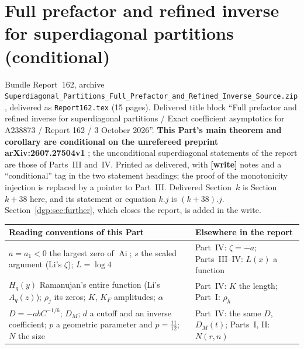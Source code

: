 \documentclass[11pt,letterpaper]{article}
\numberwithin{equation}{section}
\theoremstyle{remark}\newtheorem{remark}[theorem]{Remark}
\newcommand{\file}[1]{\nolinkurl{#1}}
\newcommand{\partsource}[1]{\par\noindent\begin{minipage}{\textwidth}\small #1\end{minipage}\par\medskip}
\begin{document}
\part{Full prefactor and refined inverse for superdiagonal partitions (conditional)}\label{dgp:pre:part}
\partsource{Bundle Report~162, archive \file{Superdiagonal_Partitions_Full_Prefactor_and_Refined_Inverse_Source.zip}, delivered as \file{Report162.tex} (15 pages). Delivered title block ``Full prefactor and refined inverse for superdiagonal partitions / Exact coefficient asymptotics for A238873 / Report 162 / 3 October 2026''. \textbf{This Part's main theorem and corollary are conditional on the unrefereed preprint arXiv:2607.27504v1} \cite{li}; the unconditional superdiagonal statements of the report are those of Parts~III and~IV. Printed as delivered, with \textbf{[write]} notes and a ``conditional'' tag in the two statement headings; the proof of the monotonicity injection is replaced by a pointer to Part~III. Delivered Section~$k$ is Section~$k+38$ here, and its statement or equation $k.j$ is $(k+38).j$. Section~\ref{dgp:sec:further}, which closes the report, is added in the write.}
\begin{center}
\small
\begin{tabular}{@{}>{\raggedright\arraybackslash}p{} >{\raggedright\arraybackslash}p{}@{}}
\toprule
Reading conventions of this Part & Elsewhere in the report\\
\midrule
$a=a_1<0$ the largest zero of $\operatorname{Ai}$; $s$ the scaled argument (Li's $\zeta$); $L=\log4$ & Part~IV: $\zeta=-a$; Parts~III--IV: $L(x)$ a function\\
$H_q(y)$ Ramanujan's entire function (Li's $A_q(z)$); $\rho_j$ its zeros; $K$, $K_F$ amplitudes; $\alpha$ & Part~IV: $K$ the length; Part~I: $\rho_h$\\
$D=-abC^{-1/6}$; $D_M$; $d$ a cutoff and an inverse coefficient; $p$ a geometric parameter and $p=\frac{11}{12}$; $N$ the size & Part~IV: the same $D$, $D_M(t)$; Parts~I, II: $N(r,n)$\\
\bottomrule
\end{tabular}
\end{center}
\end{document}
